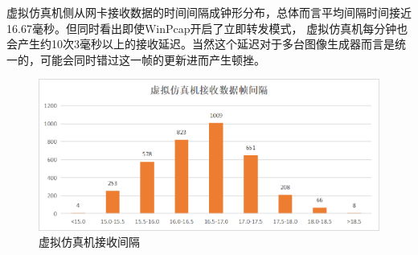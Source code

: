 虚拟仿真机侧从网卡接收数据的时间间隔成钟形分布，总体而言平均间隔时间接近16.67毫秒。但同时看出即使WinPcap开启了立即转发模式，
虚拟仿真机每分钟也会产生约10次3毫秒以上的接收延迟。当然这个延迟对于多台图像生成器而言是统一的，可能会同时错过这一帧的更新进而产生顿挫。
\begin{figure}[h!]
    \begin{center}
        \includegraphics[width=\textwidth]{pictures/interval.png}
        \caption{虚拟仿真机接收间隔}
        \label{interval}
    \end{center}
\end{figure}

